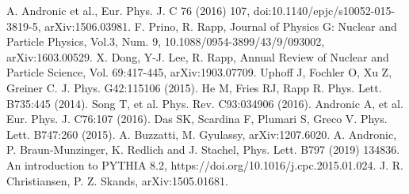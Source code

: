 \documentclass[3p,times,procedia]{elsarticle}
\begin{document}









 \begin{thebibliography}{00}


 A. Andronic et al., Eur. Phys. J. C 76 (2016) 107, doi:10.1140/epjc/s10052-015-3819-5, arXiv:1506.03981.
 F. Prino, R. Rapp, Journal of Physics G: Nuclear and Particle Physics, Vol.3, Num. 9, 10.1088/0954-3899/43/9/093002, arXiv:1603.00529.
 X. Dong, Y-J. Lee, R. Rapp, Annual Review of Nuclear and Particle Science, Vol. 69:417-445, arXiv:1903.07709.
 Uphoff J, Fochler O, Xu Z, Greiner C. J. Phys. G42:115106 (2015).
 He M, Fries RJ, Rapp R. Phys. Lett. B735:445 (2014).
 Song T, et al. Phys. Rev. C93:034906 (2016).
 Andronic A, et al. Eur. Phys. J. C76:107 (2016).
 Das SK, Scardina F, Plumari S, Greco V. Phys. Lett. B747:260 (2015).
 A. Buzzatti, M. Gyulassy, arXiv:1207.6020.
 A. Andronic, P. Braun-Munzinger, K. Redlich and J. Stachel, Phys. Lett. B797 (2019) 134836.
 An introduction to PYTHIA 8.2, https://doi.org/10.1016/j.cpc.2015.01.024.
 J. R. Christiansen, P. Z. Skands, arXiv:1505.01681.
\end{thebibliography}
\end{document}

